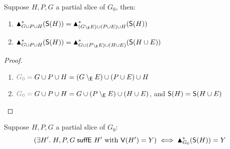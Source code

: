 \begin{lemma}
   \label{lem:appendix:proof:conjugate:algorithms-suff:aux}
   Suppose $H,P,G$ a partial slice of $G_0$, then:
   \begin{enumerate}
      \item $\blacktriangle^*_{G \cup P \cup H}(\mathsf{S}(H)) = \blacktriangle^*_{(G \setminus_{\mathsf{E}} E)\cup (P \cup E) \cup H}(\mathsf{S}(H))$
      \item $\blacktriangle^*_{G \cup P \cup H}(\mathsf{S}(H)) = \blacktriangle^*_{G \cup (P \setminus_{\mathsf{E}} E) \cup (H \cup E)}(\mathsf{S}(H \cup E))$
   \end{enumerate}
\end{lemma}
\begin{proof}
   \begin{enumerate}
      \item $\Lowlight{G_0 = }\; G \cup P \cup H = (G \edgeMinus E) \cup (P \cup E) \cup H$
      \item $\Lowlight{G_0 = }\; G \cup P \cup H = G \cup (P \edgeMinus E) \cup (H \cup E)$, and $\mathsf{S}(H) = \mathsf{S}(H \cup E)$
   \end{enumerate}
\end{proof}
\begin{proposition}
   \label{prop:appendix:proof:conjugate:algorithms-suff:correctness-sufficesE}
   Suppose $H,P,G$ a partial slice of $G_0$:
   \[ (\exists H'. \; H,P,G \mathrel{\textup{\textsf{suffE}}_{}} H' \text{ with }\textup{\textsf{V}}(H') = Y) \iff \blacktriangle^*_{G_0}(\mathsf{S}(H)) = Y\]
\end{proposition}

